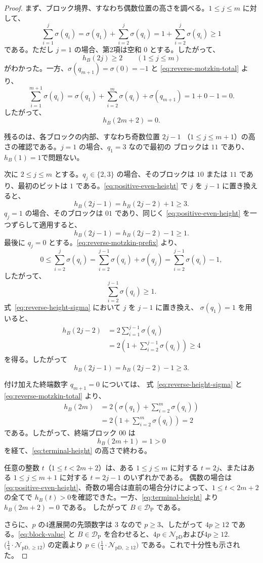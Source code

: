 \documentclass[12pt]{ltjsarticle}
\theoremstyle{plain}
\theoremstyle{definition}
\theoremstyle{plain}
\newcommand{\NpD}{\mathcal{N}_{\mathrm{pD}}}
\newcommand{\DP}{\mathcal{D}_{\mathrm{P}}}
\newcommand{\Pset}{%
  \bigl(\tfrac{1}{4}\cdot\mathcal{N}_{\mathrm{pD},\geq 12}\bigr)%
}
\begin{document}
\begin{proof}
まず、ブロック境界、すなわち偶数位置の高さを調べる。$1\leq j\leq m$ に対して、
\[
 \sum_{i=1}^{j}\sigma(q_i)
 = \sigma(q_1)+\sum_{i=2}^{j}\sigma(q_i)
=1+\sum_{i=2}^{j}\sigma(q_i)
 \geq1
\]
である。ただし $j=1$ の場合、第2項は空和 $0$ とする。したがって、
\begin{equation}\label{eq:positive-even-height}
 h_B(2j)\geq2
 \qquad(1\leq j\leq m)
\end{equation}
がわかった。一方、$\sigma(q_{m+1})=\sigma(0)=-1$ と
\eqref{eq:reverse-motzkin-total} より、
\[
 \sum_{i=1}^{m+1}\sigma(q_i)
 = \sigma(q_1)+\sum_{i=2}^{m}\sigma(q_i)+\sigma(q_{m+1})
 =1+0-1=0.
\]
したがって、
\begin{equation}\label{eq:terminal-height}
 h_B(2m+2)=0.
\end{equation}

残るのは、各ブロックの内部、すなわち奇数位置 $2j-1$
（$1\leq j\leq m+1$）の高さの確認である。$j=1$ の場合、$q_1=3$ なので最初の
ブロックは $11$ であり、$ h_B(1)=1$で問題ない。

次に $2\leq j\leq m$ とする。$q_j\in\{2,3\}$ の場合、そのブロックは $10$ または
$11$ であり、最初のビットは $1$ である。\eqref{eq:positive-even-height} で $j$ を
$j-1$ に置き換えると、
\[
 h_B(2j-1)=h_B(2j-2)+1\geq3.
\]
$q_j=1$ の場合、そのブロックは $01$ であり、同じく
\eqref{eq:positive-even-height} を一つずらして適用すると、
\[
 h_B(2j-1)=h_B(2j-2)-1\geq1.
\]
最後に $q_j=0$ とする。\eqref{eq:reverse-motzkin-prefix} より、
\[
 0\leq\sum_{i=2}^{j}\sigma(q_i)
 =\sum_{i=2}^{j-1}\sigma(q_i)+\sigma(q_j)=\sum_{i=2}^{j-1}\sigma(q_i)-1,
\]
したがって、
\[
 \sum_{i=2}^{j-1}\sigma(q_i)\geq1.
\]
式~\eqref{eq:reverse-height-sigma} において $j$ を $j-1$ に置き換え、
$\sigma(q_1)=1$ を用いると、
\[
\begin{aligned}
 h_B(2j-2)
 &=2\sum_{i=1}^{j-1}\sigma(q_i)\\
 &=2\left(1+\sum_{i=2}^{j-1}\sigma(q_i)\right)
 \geq4
\end{aligned}
\]
を得る。したがって
\[
 h_B(2j-1)=h_B(2j-2)-1\geq3.
\]

付け加えた終端数字 $q_{m+1}=0$ については、
式~\eqref{eq:reverse-height-sigma} と \eqref{eq:reverse-motzkin-total} より、
\[
\begin{aligned}
 h_B(2m)
 &=2\left(\sigma(q_1)+\sum_{i=2}^{m}\sigma(q_i)\right)\\
 &=2\left(1+\sum_{i=2}^{m}\sigma(q_i)\right)
 =2
\end{aligned}
\]
である。したがって、終端ブロック $00$ は
\[
 h_B(2m+1)=1>0
\]
を経て、\eqref{eq:terminal-height} の高さで終わる。

任意の整数 $t$（$1\leq t<2m+2$）は、ある $1\leq j\leq m$ に対する
$t=2j$、またはある $1\leq j\leq m+1$ に対する $t=2j-1$ のいずれかである。
偶数の場合は \eqref{eq:positive-even-height}、奇数の場合は直前の場合分けによって、$1\leq t<2m+2$の全てで
$ h_B(t)>0$を確認できた。一方、\eqref{eq:terminal-height} より $h_B(2m+2)=0$ である。
したがって $B\in\DP$ である。

さらに、$p$ の4進展開の先頭数字は $3$ なので $p\geq3$、したがって
$4p\geq12$ である。\eqref{eq:block-value} と $B\in\DP$ を合わせると、$ 4p\in\NpD$および$4p\geq12$.
$\Pset$ の定義より $p\in\Pset$ である。これで十分性も示された。
\end{proof}
\end{document}
